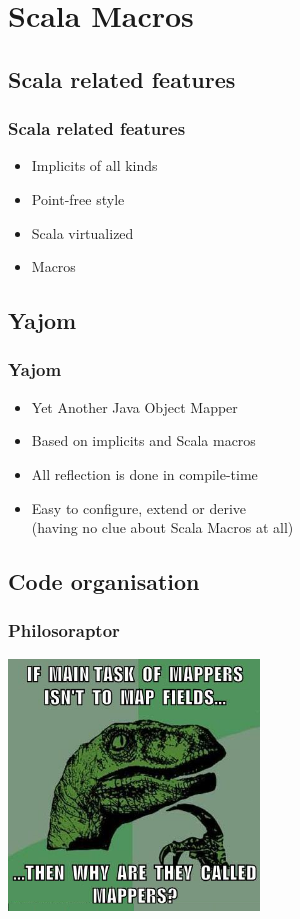 \documentclass[14pt]{beamer}
\begin{document}
\section{Scala Macros}
\subsection{Scala related features}
\frame
{\frametitle{Scala related features}
\begin{itemize}
  \item Implicits of all kinds
  \item Point-free style
  \item Scala virtualized
  \item Macros
\end{itemize}
}

\subsection{Yajom}
\frame
{\frametitle{Yajom}
\begin{itemize}
  \item Yet Another Java Object Mapper
  \item Based on implicits and Scala macros
  \item All reflection is done in compile-time
  \item Easy to configure, extend or derive \\ (having no clue about Scala Macros at all)
\end{itemize}
}

\subsection{Code organisation}
\frame
{\frametitle{Philosoraptor}
  \begin{center}
    \includegraphics[width=0.5\textwidth]{phil.png}
  \end{center}
}
\end{document}

